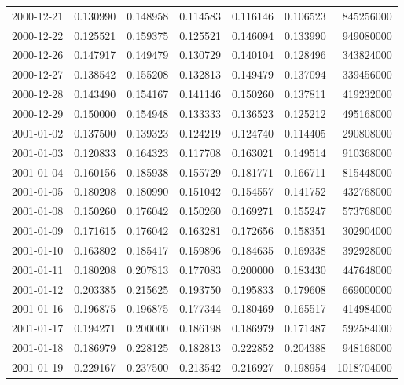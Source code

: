 \begin{tabular}{lrrrrrr}
2000-12-21 &    0.130990 &    0.148958 &    0.114583 &    0.116146 &    0.106523 &   845256000 \\
2000-12-22 &    0.125521 &    0.159375 &    0.125521 &    0.146094 &    0.133990 &   949080000 \\
2000-12-26 &    0.147917 &    0.149479 &    0.130729 &    0.140104 &    0.128496 &   343824000 \\
2000-12-27 &    0.138542 &    0.155208 &    0.132813 &    0.149479 &    0.137094 &   339456000 \\
2000-12-28 &    0.143490 &    0.154167 &    0.141146 &    0.150260 &    0.137811 &   419232000 \\
2000-12-29 &    0.150000 &    0.154948 &    0.133333 &    0.136523 &    0.125212 &   495168000 \\
2001-01-02 &    0.137500 &    0.139323 &    0.124219 &    0.124740 &    0.114405 &   290808000 \\
2001-01-03 &    0.120833 &    0.164323 &    0.117708 &    0.163021 &    0.149514 &   910368000 \\
2001-01-04 &    0.160156 &    0.185938 &    0.155729 &    0.181771 &    0.166711 &   815448000 \\
2001-01-05 &    0.180208 &    0.180990 &    0.151042 &    0.154557 &    0.141752 &   432768000 \\
2001-01-08 &    0.150260 &    0.176042 &    0.150260 &    0.169271 &    0.155247 &   573768000 \\
2001-01-09 &    0.171615 &    0.176042 &    0.163281 &    0.172656 &    0.158351 &   302904000 \\
2001-01-10 &    0.163802 &    0.185417 &    0.159896 &    0.184635 &    0.169338 &   392928000 \\
2001-01-11 &    0.180208 &    0.207813 &    0.177083 &    0.200000 &    0.183430 &   447648000 \\
2001-01-12 &    0.203385 &    0.215625 &    0.193750 &    0.195833 &    0.179608 &   669000000 \\
2001-01-16 &    0.196875 &    0.196875 &    0.177344 &    0.180469 &    0.165517 &   414984000 \\
2001-01-17 &    0.194271 &    0.200000 &    0.186198 &    0.186979 &    0.171487 &   592584000 \\
2001-01-18 &    0.186979 &    0.228125 &    0.182813 &    0.222852 &    0.204388 &   948168000 \\
2001-01-19 &    0.229167 &    0.237500 &    0.213542 &    0.216927 &    0.198954 &  1018704000 \\

\end{tabular}
